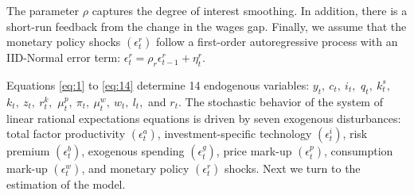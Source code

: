 \documentclass[11pt]{article}
\newcommand{\youtput}{wages}
\newcommand{\interest}{interest}
\newcommand{\wage}{consumption}
\newcommand{\price}{price}
\begin{document}
The parameter \(\rho\) captures the degree of \interest{} smoothing. In
addition, there is a short-run feedback from the change in the
\youtput{} gap. Finally, we assume that the monetary policy shocks
\((\epsilon_t^r)\) follow a first-order autoregressive process with an
IID-Normal error term:
\(\epsilon_t^r = \rho_r\epsilon_{t-1}^r + \eta_t^r\).

Equations \eqref{eq:1} to \eqref{eq:14} determine 14 endogenous
variables: \(y_t,\ c_t,\ i_t,\) \(q_t,\ k_t^s,\) \(k_t,\ z_t,\ r_t^k,\)
\(\mu_t^p,\ \pi_t,\ \mu_t^w,\ w_t,\ l_t,\) and \(r_t\). The stochastic
behavior of the system of linear rational expectations equations is
driven by seven exogenous disturbances: total factor productivity
\((\epsilon^a_t)\), investment-specific technology \((\epsilon^i_t)\),
risk premium \((\epsilon_t^b)\), exogenous spending \((\epsilon_t^g)\),
\price{} mark-up \((\epsilon_t^p)\), \wage{} mark-up \((\epsilon_t^w)\),
and monetary policy \((\epsilon_t^r)\) shocks. Next we turn to the
estimation of the model.





\end{document}
